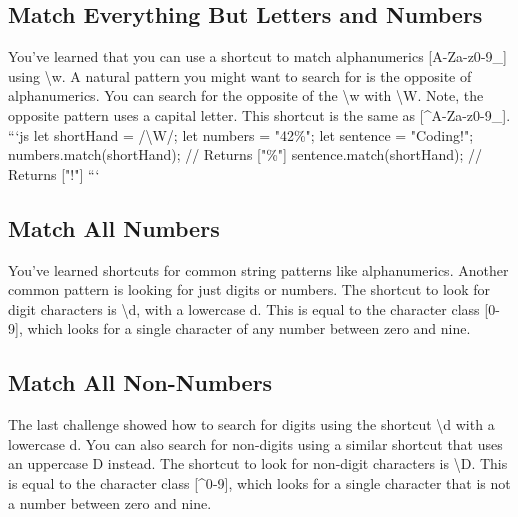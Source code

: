 \documentclass{article}%
\begin{document}
%
\subsection{Match Everything But Letters and Numbers}%
\label{subsec:MatchEverythingButLettersandNumbers}%
You've learned that you can use a shortcut to match alphanumerics {[}A{-}Za{-}z0{-}9\_{]} using \textbackslash{}w. A natural pattern you might want to search for is the opposite of alphanumerics.\newline%
You can search for the opposite of the \textbackslash{}w with \textbackslash{}W. Note, the opposite pattern uses a capital letter. This shortcut is the same as {[}\^{}A{-}Za{-}z0{-}9\_{]}.\newline%
```js\newline%
let shortHand = /\textbackslash{}W/;\newline%
let numbers = "42\%";\newline%
let sentence = "Coding!";\newline%
numbers.match(shortHand); // Returns {[}"\%"{]}\newline%
sentence.match(shortHand); // Returns {[}"!"{]}\newline%
```\newline%

%
\subsection{Match All Numbers}%
\label{subsec:MatchAllNumbers}%
You've learned shortcuts for common string patterns like alphanumerics. Another common pattern is looking for just digits or numbers.\newline%
The shortcut to look for digit characters is \textbackslash{}d, with a lowercase d. This is equal to the character class {[}0{-}9{]}, which looks for a single character of any number between zero and nine.\newline%

%
\subsection{Match All Non{-}Numbers}%
\label{subsec:MatchAllNon{-}Numbers}%
The last challenge showed how to search for digits using the shortcut \textbackslash{}d with a lowercase d. You can also search for non{-}digits using a similar shortcut that uses an uppercase D instead.\newline%
The shortcut to look for non{-}digit characters is \textbackslash{}D. This is equal to the character class {[}\^{}0{-}9{]}, which looks for a single character that is not a number between zero and nine.\newline%
\end{document}
